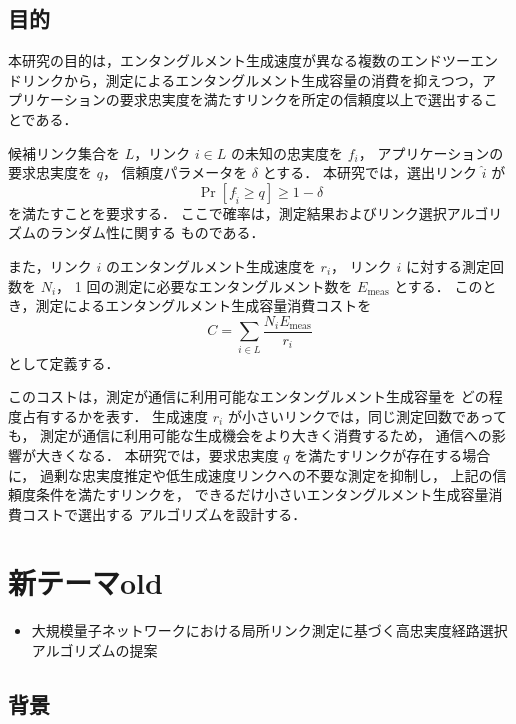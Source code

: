 \documentclass[conference]{IEEEtran}
\begin{document}
\subsection{目的}
\label{sec:org2ca255e}

本研究の目的は，エンタングルメント生成速度が異なる複数のエンドツーエン
ドリンクから，測定によるエンタングルメント生成容量の消費を抑えつつ，ア
プリケーションの要求忠実度を満たすリンクを所定の信頼度以上で選出するこ
とである．

候補リンク集合を \(L\)，リンク \(i \in L\) の未知の忠実度を \(f_i\)，
アプリケーションの要求忠実度を \(q\)，
信頼度パラメータを \(\delta\) とする．
本研究では，選出リンク \(\hat{i}\) が
\begin{equation}
  \Pr \left[ f_{\hat{i}} \ge q \right] \ge 1-\delta
\end{equation}
を満たすことを要求する．
ここで確率は，測定結果およびリンク選択アルゴリズムのランダム性に関する
ものである．

また，リンク \(i\) のエンタングルメント生成速度を \(r_i\)，
リンク \(i\) に対する測定回数を \(N_i\)，
1 回の測定に必要なエンタングルメント数を \(E_{\mathrm{meas}}\) とする．
このとき，測定によるエンタングルメント生成容量消費コストを
\begin{equation}
  C =
  \sum_{i \in L}
  \frac{N_i E_{\mathrm{meas}}}{r_i}
\end{equation}
として定義する．

このコストは，測定が通信に利用可能なエンタングルメント生成容量を
どの程度占有するかを表す．
生成速度 \(r_i\) が小さいリンクでは，同じ測定回数であっても，
測定が通信に利用可能な生成機会をより大きく消費するため，
通信への影響が大きくなる．
本研究では，要求忠実度 \(q\) を満たすリンクが存在する場合に，
過剰な忠実度推定や低生成速度リンクへの不要な測定を抑制し，
上記の信頼度条件を満たすリンクを，
できるだけ小さいエンタングルメント生成容量消費コストで選出する
アルゴリズムを設計する．

\section{新テーマold}
\label{sec:org5340c86}
\begin{itemize}
\item 大規模量子ネットワークにおける局所リンク測定に基づく高忠実度経路選択アルゴリズムの提案
\end{itemize}

\subsection{背景}
\label{sec:orgd6b5b54}
\end{document}
